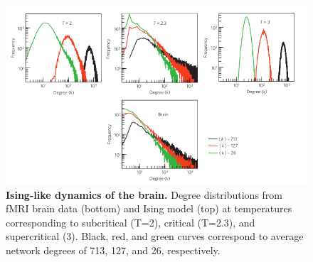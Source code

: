 \documentclass[12pt]{article}
\begin{document}
\begin{figure}      
  \begin{center}    
 \includegraphics[width=.8\textwidth]{isinglikedynamicschialvo}    
    \caption{\textbf{Ising-like dynamics of the brain.} Degree distributions from fMRI brain data (bottom) and Ising model (top) at temperatures corresponding to subcritical (T=2), critical (T=2.3), and supercritical (3). Black, red, and green curves correspond to average network degrees of 713, 127, and 26, respectively. \cite{Fraiman2009a}}   
   \label{Figure::Ising model and the brain at criticality}   
  \end{center}     
   \end{figure}
\end{document}
